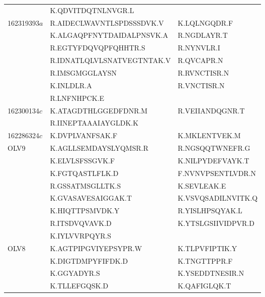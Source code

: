 \begin{longtable}{p{1.5cm}p{6cm}p{6cm}}
  & K.QDVITDQTNLNVGR.L & \\
162319393$a$ & R.AIDECLWAVNTLSPDSSSDVK.V & K.LQLNGQDR.F \\
  & K.ALGAQPFNYTDAIDALPNSVK.A & R.NGDLAYR.T \\
  & R.EGTYFDQVQPFQHHTR.S & R.NYNVLR.I \\
  & R.IDNATLQLVLSNATVEGTNTAK.V & R.QVCAPR.N \\
  & R.IMSGMGGLAYSN & R.RVNCTISR.N \\
  & K.INLDLR.A  & R.VNCTISR.N \\
  & R.LNFNHPCK.E \\
162300134$c$ & K.ATAGDTHLGGEDFDNR.M & R.VEIIANDQGNR.T \\
  & R.IINEPTAAAIAYGLDK.K & \\
162286324$c$ & K.DVPLVANFSAK.F & K.MKLENTVEK.M \\
OLV9 & K.AGLLSEMDAYSLYQMSR.R & R.NGSQQTWNEFR.G\\
  & K.ELVLSFSSGVK.F & K.NILPYDEFVAYK.T\\
  & K.FGTQASTLFLK.D & F.NVNVPSENTLVDR.N\\
  & R.GSSATMSGLLTK.S & K.SEVLEAK.E \\
  & K.GVASAVESAIGGAK.T & K.VSVQSADILNVITK.Q \\
  & K.HIQTTPSMVDK.Y & R.YISLHPSQYAK.L \\
  & R.ITSDVQVAVK.D  & K.YTSLGSIIVIDPVR.D \\
  & K.IYLVVRPQYR.S & \\
OLV8 & K.AGTPIPGVIYEPSYPR.W & K.TLPVFIPTIK.Y \\
  & K.DIGTDMPYFIFDK.D & K.TNGTTPPR.F \\
  & K.GGYADYR.S & K.YSEDDTNESIR.N \\
  & K.TLLEFGQSK.D & K.QAFIGLQK.T \\
\end{longtable}
\endgroup
